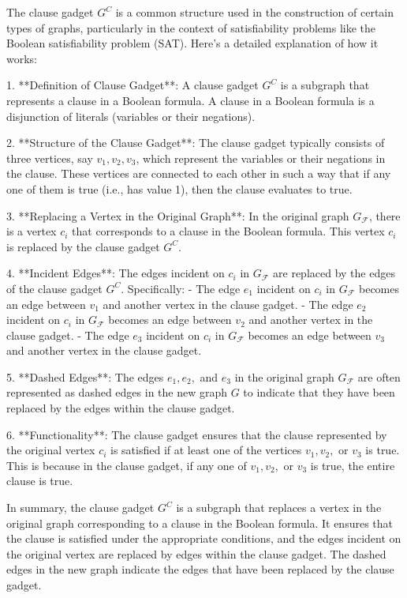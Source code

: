 The clause gadget \( G^C \) is a common structure used in the construction of certain types of graphs, particularly in the context of satisfiability problems like the Boolean satisfiability problem (SAT). Here's a detailed explanation of how it works:

1. **Definition of Clause Gadget**: A clause gadget \( G^C \) is a subgraph that represents a clause in a Boolean formula. A clause in a Boolean formula is a disjunction of literals (variables or their negations).

2. **Structure of the Clause Gadget**: The clause gadget typically consists of three vertices, say \( v_1, v_2, v_3 \), which represent the variables or their negations in the clause. These vertices are connected to each other in such a way that if any one of them is true (i.e., has value 1), then the clause evaluates to true.

3. **Replacing a Vertex in the Original Graph**: In the original graph \( G_\mathcal{F} \), there is a vertex \( c_i \) that corresponds to a clause in the Boolean formula. This vertex \( c_i \) is replaced by the clause gadget \( G^C \).

4. **Incident Edges**: The edges incident on \( c_i \) in \( G_\mathcal{F} \) are replaced by the edges of the clause gadget \( G^C \). Specifically:
   - The edge \( e_1 \) incident on \( c_i \) in \( G_\mathcal{F} \) becomes an edge between \( v_1 \) and another vertex in the clause gadget.
   - The edge \( e_2 \) incident on \( c_i \) in \( G_\mathcal{F} \) becomes an edge between \( v_2 \) and another vertex in the clause gadget.
   - The edge \( e_3 \) incident on \( c_i \) in \( G_\mathcal{F} \) becomes an edge between \( v_3 \) and another vertex in the clause gadget.

5. **Dashed Edges**: The edges \( e_1, e_2, \) and \( e_3 \) in the original graph \( G_\mathcal{F} \) are often represented as dashed edges in the new graph \( G \) to indicate that they have been replaced by the edges within the clause gadget.

6. **Functionality**: The clause gadget ensures that the clause represented by the original vertex \( c_i \) is satisfied if at least one of the vertices \( v_1, v_2, \) or \( v_3 \) is true. This is because in the clause gadget, if any one of \( v_1, v_2, \) or \( v_3 \) is true, the entire clause is true.

In summary, the clause gadget \( G^C \) is a subgraph that replaces a vertex in the original graph corresponding to a clause in the Boolean formula. It ensures that the clause is satisfied under the appropriate conditions, and the edges incident on the original vertex are replaced by edges within the clause gadget. The dashed edges in the new graph indicate the edges that have been replaced by the clause gadget.